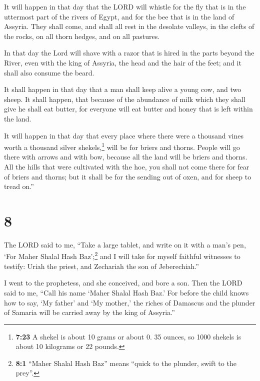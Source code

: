  It will happen in that day that the LORD will whistle
for the fly that is in the uttermost part of the rivers of Egypt, and
for the bee that is in the land of Assyria.  They shall
come, and shall all rest in the desolate valleys, in the clefts of the
rocks, on all thorn hedges, and on all pastures.

 In that day the Lord will shave with a razor that is
hired in the parts beyond the River, even with the king of Assyria, the
head and the hair of the feet; and it shall also consume the beard.

 It shall happen in that day that a man shall keep alive
a young cow, and two sheep.  It shall happen, that
because of the abundance of milk which they shall give he shall eat
butter, for everyone will eat butter and honey that is left within the
land.

 It will happen in that day that every place where there
were a thousand vines worth a thousand silver shekels,\footnote{\textbf{7:23}
  A shekel is about 10 grams or about 0. 35 ounces, so 1000 shekels is
  about 10 kilograms or 22 pounds.} will be for briers and thorns.
 People will go there with arrows and with bow, because
all the land will be briers and thorns.  All the hills
that were cultivated with the hoe, you shall not come there for fear of
briers and thorns; but it shall be for the sending out of oxen, and for
sheep to tread on.''

\hypertarget{section-7}{%
\section{8}\label{section-7}}

 The LORD said to me, ``Take a large tablet, and write on
it with a man's pen, `For Maher Shalal Hash Baz';\footnote{\textbf{8:1}
  ``Maher Shalal Hash Baz'' means ``quick to the plunder, swift to the
  prey''.}  and I will take for myself faithful witnesses
to testify: Uriah the priest, and Zechariah the son of Jeberechiah.''

 I went to the prophetess, and she conceived, and bore a
son. Then the LORD said to me, ``Call his name `Maher Shalal Hash Baz.'
 For before the child knows how to say, `My father' and
`My mother,' the riches of Damascus and the plunder of Samaria will be
carried away by the king of Assyria.''

